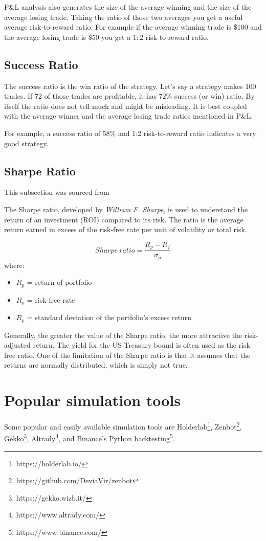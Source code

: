 P\&L analysis also generates the size of the average winning and the size of the average losing trade. Taking the ratio of those two averages you get a useful average risk-to-reward ratio. For example if the average winning trade is \$100 and the average losing trade is \$50 you get a $1:2$ risk-to-reward ratio.

\subsection{Success Ratio}
The success ratio is the win ratio of the strategy. Let's say a strategy makes 100 trades. If 72 of those trades are profitable, it has 72\% success (or win) ratio. By itself the ratio does not tell much and might be misleading. It is best coupled with the average winner and the average losing trade ratios mentioned in P\&L.

For example, a success ratio of 58\% and 1:2 risk-to-reward ratio indicates a very good strategy.

\subsection{Sharpe Ratio}
This subsection was sourced from \cite{investopedia:sharpe-ratio}

The Sharpe ratio, developed by \emph{William F. Sharpe}, is used to understand the return of an investment (ROI) compared to its risk. The ratio is the average return earned in excess of the risk-free rate per unit of volatility or total risk.

$$Sharpe\ ratio = \frac{R_p - R_f}{\sigma _p}$$
where:
\begin{itemize}
    \item $R_p$ = return of portfolio
    \item $R_p$ = risk-free rate
    \item $R_p$ = standard deviation of the portfolio's excess return
\end{itemize}

Generally, the greater the value of the Sharpe ratio, the more attractive the risk-adjusted return. The yield for the US Treasury bound is often used as the risk-free ratio. One of the limitation of the Sharpe ratio is that it assumes that the returns are normally distributed, which is simply not true.

\section{Popular simulation tools}
Some popular and easily available simulation tools are Holderlab\footnote{https://holderlab.io/}, Zenbot\footnote{https://github.com/DeviaVir/zenbot}, Gekko\footnote{https://gekko.wizb.it/}, Altrady\footnote{https://www.altrady.com/}, and Binance's Python backtesting\footnote{https://www.binance.com/}.

